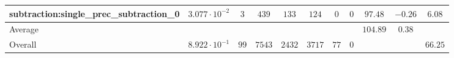 \begin{tabular}{|l|c|c|c|c|c|c|c|c|c|c|}
subtraction:single\_prec\_subtraction\_0         & $ 3.077 \cdot 10^{-2} $ & $ 3      $ & $ 439  $ & $ 133  $ & $ 124   $ & $ 0  $ & $ 0 $ & $ 97.48       $ & $ -0.26   $ & $ 6.08    $ \\
\hline
Average                                          & $                     $ & $        $ & $      $ & $      $ & $       $ & $    $ & $   $ & $ 104.89      $ & $ 0.38    $ & $         $ \\
\hline
Overall                                          & $ 8.922 \cdot 10^{-1} $ & $ 99     $ & $ 7543 $ & $ 2432 $ & $ 3717  $ & $ 77 $ & $ 0 $ & $             $ & $         $ & $ 66.25   $ \\
\hline
\end{tabular}

